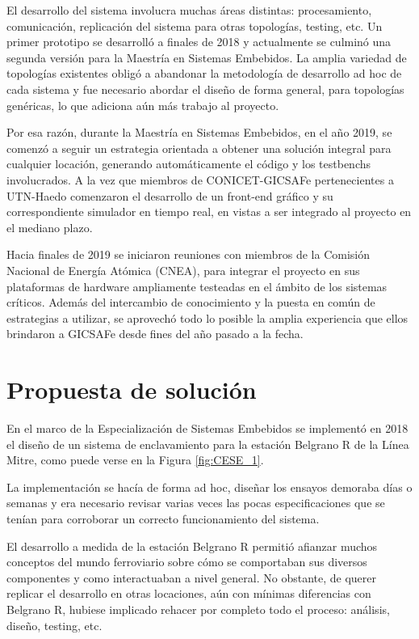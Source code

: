 		El desarrollo del sistema involucra muchas áreas distintas: procesamiento, comunicación, replicación del sistema para otras topologías, testing, etc. Un primer prototipo se desarrolló a finales de 2018 y actualmente se culminó una segunda versión para la Maestría en Sistemas Embebidos. La amplia variedad de topologías existentes obligó a abandonar la metodología de desarrollo ad hoc de cada sistema y fue necesario abordar el diseño de forma general, para topologías genéricas, lo que adiciona aún más trabajo al proyecto.		
		
		Por esa razón, durante la Maestría en Sistemas Embebidos, en el año 2019, se comenzó a seguir un estrategia orientada a obtener una solución integral para cualquier locación, generando automáticamente el código y los testbenchs involucrados. A la vez que miembros de CONICET-GICSAFe pertenecientes a UTN-Haedo comenzaron el desarrollo de un front-end gráfico y su correspondiente simulador en tiempo real, en vistas a ser integrado al proyecto en el mediano plazo.
	
		Hacia finales de 2019 se iniciaron reuniones con miembros de la Comisión Nacional de Energía Atómica (CNEA), para integrar el proyecto en sus plataformas de hardware ampliamente testeadas en el ámbito de los sistemas críticos. Además del intercambio de conocimiento y la puesta en común de estrategias a utilizar, se aprovechó todo lo posible la amplia experiencia que ellos brindaron a GICSAFe desde fines del año pasado a la fecha.
		
	\section{Propuesta de solución}	
		
		En el marco de la Especialización de Sistemas Embebidos se implementó en 2018 el diseño de un sistema de enclavamiento para la estación Belgrano R de la Línea Mitre, como puede verse en la Figura \ref{fig:CESE_1}. %
		
		La implementación se hacía de forma ad hoc, diseñar los ensayos demoraba días o semanas y era necesario revisar varias veces las pocas especificaciones que se tenían para corroborar un correcto funcionamiento del sistema.	
		
		El desarrollo a medida de la estación Belgrano R permitió afianzar muchos conceptos del mundo ferroviario sobre cómo se comportaban sus diversos componentes y como interactuaban a nivel general. No obstante, de querer replicar el desarrollo en otras locaciones, aún con mínimas diferencias con Belgrano R, hubiese implicado rehacer por completo todo el proceso: análisis, diseño, testing, etc.
		
